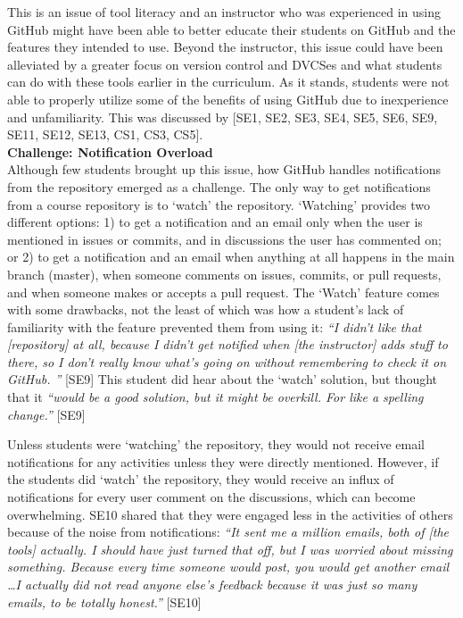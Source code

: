 

This is an issue of tool literacy and an instructor who was experienced in using GitHub might have been able to better educate their students on GitHub and the features they intended to use. Beyond the instructor, this issue could have been alleviated by a greater focus on version control and DVCSes and what students can do with these tools earlier in the curriculum. As it stands, students were not able to properly utilize some of the benefits of using GitHub due to inexperience and unfamiliarity. This was discussed by [SE1, SE2, SE3, SE4, SE5, SE6, SE9, SE11, SE12, SE13, CS1, CS3, CS5]. \\

\textbf{Challenge: Notification Overload} \\
Although few students brought up this issue, how GitHub handles notifications from the repository emerged as a challenge. The only way to get notifications from a course repository is to `watch' the repository. `Watching' provides two different options: 1) to get a notification and an email only when the user is mentioned in issues or commits, and in discussions the user has commented on; or 2) to get a notification and an email when anything at all happens in the main branch (master), when someone comments on issues, commits, or pull requests, and when someone makes or accepts a pull request. The `Watch' feature comes with some drawbacks, not the least of which was how a student's lack of familiarity with the feature prevented them from using it: \textit{``I didn't like that [repository] at all, because I didn't get notified when [the instructor] adds stuff to there, so I don't really know what's going on without remembering to check it on GitHub. ''} [SE9] This student did hear about the `watch' solution, but thought that it \textit{``would be a good solution, but it might be overkill. For like a spelling change.''} [SE9]

Unless students were `watching' the repository, they would not receive email notifications for any activities unless they were directly mentioned. However, if the students did `watch' the repository, they would receive an influx of notifications for every user comment on the discussions, which can become overwhelming. SE10 shared that they were engaged less in the activities of others because of the noise from notifications: \textit{``It sent me a million emails, both of [the tools] actually. I should have just turned that off, but I was worried about missing something. Because every time someone would post, you would get another email \ldots I actually did not read anyone else's feedback because it was just so many emails, to be totally honest.''} [SE10]


